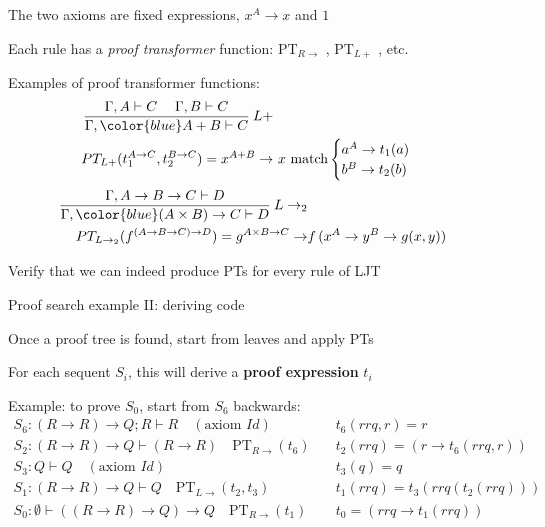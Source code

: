 The two axioms are fixed expressions, $x^{A}\rightarrow x$ and $1$

Each rule has a \emph{proof transformer} function: $\text{PT}_{R\rightarrow}$
, $\text{PT}_{L+}$ , etc.

Examples of proof transformer functions:
\begin{align*}
\frac{\Gamma,A\vdash C\quad\;\Gamma,B\vdash C}{\Gamma,{\color{blue}A+B}\vdash C}\:L+\\
PT_{L+}(t_{1}^{A\rightarrow C},t_{2}^{B\rightarrow C})=x^{A+B}\rightarrow & \ x\ \text{match}\begin{cases}
a^{A}\rightarrow t_{1}(a)\\
b^{B}\rightarrow t_{2}(b)
\end{cases}
\end{align*}
\begin{align*}
\frac{\Gamma,A\rightarrow B\rightarrow C\vdash D}{\Gamma,{\color{blue}(A\times B)\rightarrow C}\vdash D}\:L\rightarrow_{2}\\
PT_{L\rightarrow_{2}}(f^{\left(A\rightarrow B\rightarrow C\right)\rightarrow D})=g^{A\times B\rightarrow C}\rightarrow & f\,(x^{A}\rightarrow y^{B}\rightarrow g(x,y))
\end{align*}

Verify that we can indeed produce PTs for every rule of LJT

Proof search example II: deriving code

Once a proof tree is found, start from leaves and apply PTs

For each sequent $S_{i}$, this will derive a \textbf{proof expression}
$t_{i}$

Example: to prove $S_{0}$, start from $S_{6}$ backwards:{\footnotesize{}
\begin{align*}
S_{6}:\left(R\rightarrow R\right)\rightarrow Q;R\vdash R\quad(\text{axiom }Id)\quad & t_{6}(rrq,r)=r\\
S_{2}:\left(R\rightarrow R\right)\rightarrow Q\vdash\left(R\rightarrow R\right)\quad\text{PT}_{R\rightarrow}(t_{6})\quad & t_{2}(rrq)=\left(r\rightarrow t_{6}(rrq,r)\right)\\
S_{3}:Q\vdash Q\quad(\text{axiom }Id)\quad & t_{3}(q)=q\\
S_{1}:\left(R\rightarrow R\right)\rightarrow Q\vdash Q\quad\text{PT}_{L\rightarrow}(t_{2},t_{3})\quad & t_{1}(rrq)=t_{3}(rrq(t_{2}(rrq)))\\
S_{0}:\emptyset\vdash\left(\left(R\rightarrow R\right)\rightarrow Q\right)\rightarrow Q\quad\text{PT}_{R\rightarrow}(t_{1})\quad & t_{0}=\left(rrq\rightarrow t_{1}(rrq)\right)
\end{align*}
}{\footnotesize\par}

